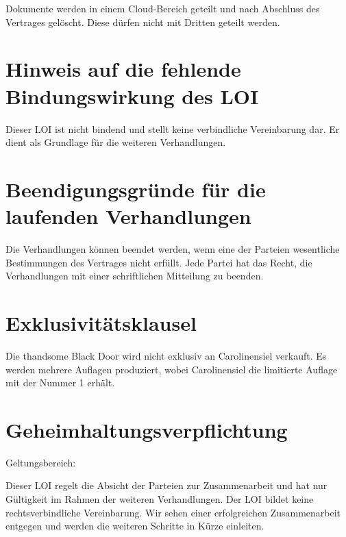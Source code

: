 Dokumente werden in einem Cloud-Bereich geteilt und nach Abschluss des Vertrages gelöscht.
Diese dürfen nicht mit Dritten geteilt werden. 

  
\section[Bindungswirkung]{Hinweis auf die fehlende Bindungswirkung des LOI}
 
Dieser LOI ist nicht bindend und stellt keine verbindliche Vereinbarung dar. 
Er dient als Grundlage für die weiteren Verhandlungen. 

  
\section[Beendigungsgründe]{Beendigungsgründe für die laufenden Verhandlungen}

Die Verhandlungen können beendet werden, wenn eine der Parteien wesentliche Bestimmungen
des Vertrages nicht erfüllt. Jede Partei hat das Recht, die Verhandlungen mit einer schriftlichen Mitteilung zu beenden. 

  
\section[Exklusivitätsklausel]{Exklusivitätsklausel}
 
Die thandsome Black Door wird nicht exklusiv an Carolinensiel verkauft.
Es werden mehrere Auflagen produziert, wobei Carolinensiel die limitierte Auflage mit der Nummer 1 erhält. 

\newpage
\section[Geheimhaltungsverpflichtung]{Geheimhaltungsverpflichtung}
Geltungsbereich: 

Dieser LOI regelt die Absicht der Parteien zur Zusammenarbeit und hat nur Gültigkeit im Rahmen der weiteren Verhandlungen. Der LOI bildet keine rechtsverbindliche Vereinbarung. 
Wir sehen einer erfolgreichen Zusammenarbeit entgegen und werden die weiteren Schritte in Kürze einleiten. 


\vspace{2cm}
\begin{flushleft}
    \makebox[.4\textwidth]{\hrulefill}\hfill    \makebox[.4\textwidth]{\hrulefill}\\
    \hfill
    \\
\end{flushleft}

\vspace{2cm}
\begin{flushleft}
    \makebox[.4\textwidth]{\hrulefill}\hfill    \makebox[.4\textwidth]{\hrulefill}\\
    \hfill
    \\
\end{flushleft}